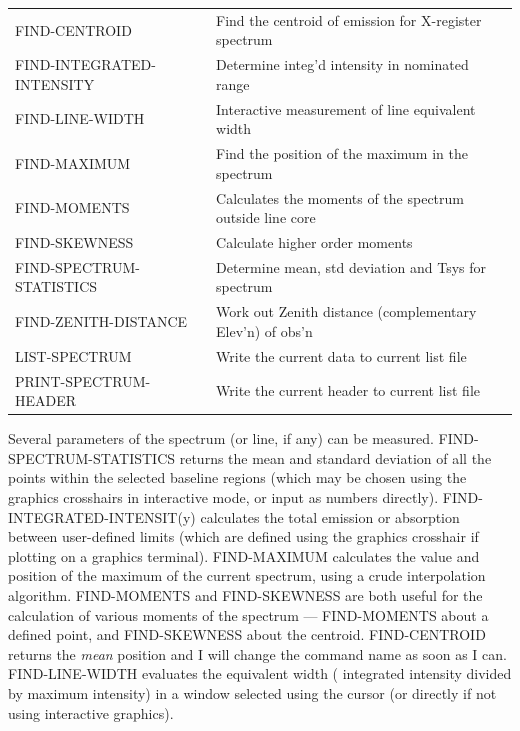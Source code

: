 \documentclass[11pt,twoside]{report}
\begin{document}
\begin{tabular}{ll}
FIND-CENTROID          & Find the centroid of emission for X-register spectrum\\
FIND-INTEGRATED-INTENSITY  & Determine integ'd intensity in nominated range\\
FIND-LINE-WIDTH        & Interactive measurement of line equivalent width \\
FIND-MAXIMUM           & Find the position of the maximum in the spectrum\\
FIND-MOMENTS           & Calculates the moments of the spectrum outside line core\\
FIND-SKEWNESS          & Calculate higher order moments\\
FIND-SPECTRUM-STATISTICS   & Determine mean, std deviation and Tsys for spectrum\\
FIND-ZENITH-DISTANCE   & Work out Zenith distance (complementary Elev'n) of obs'n\\
LIST-SPECTRUM          & Write the current data to current list file\\
PRINT-SPECTRUM-HEADER  & Write the current header to current list file\\
\end{tabular}

Several parameters of the spectrum (or line, if any) can be measured.
FIND-SPECTRUM-STATISTICS returns the mean and standard deviation of all the
points within the selected baseline regions (which may be chosen using the
graphics crosshairs in interactive mode, or input as numbers directly).
FIND-INTEGRATED-INTENSIT(y) calculates the total emission or absorption between
user-defined limits (which are defined using the graphics
crosshair if plotting on a graphics terminal).
FIND-MAXIMUM calculates the value and position of the maximum of the current
spectrum, using a crude interpolation algorithm. FIND-MOMENTS and FIND-SKEWNESS
are both useful for the calculation of various moments of the spectrum ---
FIND-MOMENTS about a defined point, and FIND-SKEWNESS about the centroid.
FIND-CENTROID returns the {\em mean} position and I will change the command
name as soon as I can. FIND-LINE-WIDTH evaluates the equivalent width (\ie
integrated intensity divided by maximum intensity) in a window selected using
the cursor (or directly if not using interactive graphics).
\end{document}
